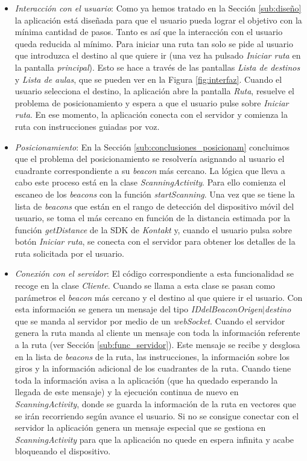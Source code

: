 \begin{itemize}
	\item \textit{Interacción con el usuario}: Como ya hemos tratado en la Sección \ref{sub:diseño} la aplicación está diseñada para que el usuario pueda lograr el objetivo con la mínima cantidad de pasos. Tanto es así que la interacción con el usuario queda reducida al mínimo. Para iniciar una ruta tan solo se pide al usuario que introduzca el destino al que quiere ir (una vez ha pulsado \textit{Iniciar ruta} en la pantalla \textit{principal}). Esto se hace a través de las pantallas \textit{Lista de destinos} y \textit{Lista de aulas}, que se pueden ver en la Figura \ref{fig:interfaz}. Cuando el usuario selecciona el destino, la aplicación abre la pantalla \textit{Ruta}, resuelve el problema de posicionamiento y espera a que el usuario pulse sobre \textit{Iniciar ruta}. En ese momento, la aplicación conecta con el servidor y comienza la ruta con instrucciones guiadas por voz.
	
	\item \textit{Posicionamiento}: En la Sección \ref{sub:conclusiones_posicionam} concluimos que el problema del posicionamiento se resolvería asignando al usuario el cuadrante correspondiente a su \textit{beacon} más cercano. La lógica que lleva a cabo este proceso está en la clase \textit{ScanningActivity}. Para ello comienza el escaneo de los \textit{beacons} con la función \textit{startScanning}. Una vez que se tiene la lista de \textit{beacons} que están en el rango de detección del dispositivo móvil del usuario, se toma el más cercano en función de la distancia estimada por la función \textit{getDistance} de la SDK de \textit{Kontakt} y, cuando el usuario pulsa sobre botón \textit{Iniciar ruta}, se conecta con el servidor para obtener los detalles de la ruta solicitada por el usuario. 
	
	
	\item \textit{Conexión con el servidor}: El código correspondiente a esta funcionalidad se recoge en la clase \textit{Cliente}. Cuando se llama a esta clase se pasan como parámetros el \textit{beacon} más cercano y el destino al que quiere ir el usuario. Con esta información se genera un mensaje del tipo \textit{IDdelBeaconOrigen$|$destino} que se manda al servidor por medio de un \textit{webSocket}. Cuando el servidor genera la ruta manda al cliente un mensaje con toda la información referente a la ruta (ver Sección \ref{sub:func_servidor}). Este mensaje se recibe y desglosa en la lista de \textit{beacons} de la ruta, las instrucciones, la información sobre los giros y la información adicional de los cuadrantes de la ruta. Cuando tiene toda la información avisa a la aplicación (que ha quedado esperando la llegada de este mensaje) y la ejecución continua de nuevo en \textit{ScanningActivity}, donde se guarda la información de la ruta en vectores que se irán recorriendo según avance el usuario. Si no se consigue conectar con el servidor la aplicación genera un mensaje especial que se gestiona en \textit{ScanningActivity} para que la aplicación no quede en espera infinita y acabe bloqueando el dispositivo.
	

\end{itemize}
